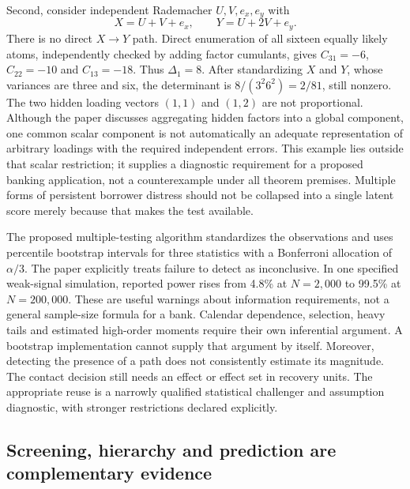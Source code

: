 Second, consider independent Rademacher $U,V,e_x,e_y$ with
\[
 X=U+V+e_x,\qquad Y=U+2V+e_y.
\]
There is no direct $X\to Y$ path. Direct enumeration of all sixteen equally
likely atoms, independently checked by adding factor cumulants, gives
$C_{31}=-6$, $C_{22}=-10$ and $C_{13}=-18$. Thus $\Delta_1=8$.
After standardizing $X$ and $Y$, whose variances are three and six,
the determinant is $8/(3^2 6^2)=2/81$, still nonzero. The two hidden
loading vectors $(1,1)$ and $(1,2)$ are not proportional. Although the
paper discusses aggregating hidden factors into a global component, one
common scalar component is not automatically an adequate representation of
arbitrary loadings with the required independent errors. This example lies
outside that scalar restriction; it supplies a diagnostic requirement for a
proposed banking application, not a counterexample under all theorem
premises. Multiple forms of persistent borrower distress should not be
collapsed into a single latent score merely because that makes the test
available.
\citep{exec15_latent_shi,exec15_latent_exact}

The proposed multiple-testing algorithm standardizes the observations and
uses percentile bootstrap intervals for three statistics with a Bonferroni
allocation of $\alpha/3$. The paper explicitly treats failure to detect as
inconclusive. In one specified weak-signal simulation, reported power rises
from 4.8\% at $N=2{,}000$ to 99.5\% at $N=200{,}000$. These are useful
warnings about information requirements, not a general sample-size formula
for a bank. Calendar dependence, selection, heavy tails and estimated
high-order moments require their own inferential argument. A bootstrap
implementation cannot supply that argument by itself. Moreover, detecting
the presence of a path does not consistently estimate its magnitude. The
contact decision still needs an effect or effect set in recovery units.
The appropriate reuse is a narrowly qualified statistical challenger and
assumption diagnostic, with stronger restrictions declared explicitly.
\citep{exec15_latent_shi}

\subsection{Screening, hierarchy and prediction are complementary evidence}

